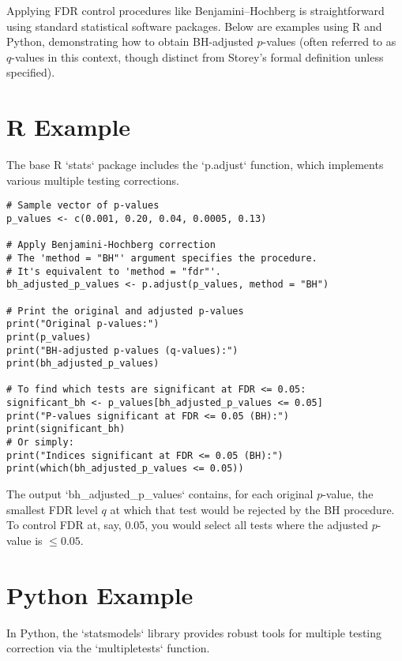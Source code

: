 \documentclass[12pt]{book}
\newcommand{\pvalue}{$p$-value}          %
\newcommand{\qvalue}{$q$-value}          %
\begin{document}
Applying FDR control procedures like Benjamini–Hochberg is straightforward using standard statistical software packages. Below are examples using R and Python, demonstrating how to obtain BH-adjusted \pvalue s (often referred to as \qvalue s in this context, though distinct from Storey's formal definition unless specified).

\section{R Example}
The base R `stats` package includes the `p.adjust` function, which implements various multiple testing corrections.

\begin{verbatim}
# Sample vector of p-values
p_values <- c(0.001, 0.20, 0.04, 0.0005, 0.13)

# Apply Benjamini-Hochberg correction
# The 'method = "BH"' argument specifies the procedure.
# It's equivalent to 'method = "fdr"'.
bh_adjusted_p_values <- p.adjust(p_values, method = "BH")

# Print the original and adjusted p-values
print("Original p-values:")
print(p_values)
print("BH-adjusted p-values (q-values):")
print(bh_adjusted_p_values)

# To find which tests are significant at FDR <= 0.05:
significant_bh <- p_values[bh_adjusted_p_values <= 0.05]
print("P-values significant at FDR <= 0.05 (BH):")
print(significant_bh)
# Or simply:
print("Indices significant at FDR <= 0.05 (BH):")
print(which(bh_adjusted_p_values <= 0.05))
\end{verbatim}

The output `bh_adjusted_p_values` contains, for each original \pvalue, the smallest FDR level $q$ at which that test would be rejected by the BH procedure. To control FDR at, say, 0.05, you would select all tests where the adjusted \pvalue{} is $\le 0.05$.

\section{Python Example}
In Python, the `statsmodels` library provides robust tools for multiple testing correction via the `multipletests` function.
\end{document}
